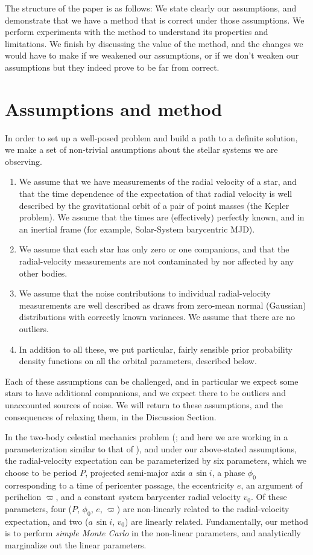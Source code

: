 \documentclass[12pt, preprint]{aastex}
\newcommand{\asini}{a\,\sin i}
\begin{document}
The structure of the paper is as follows:
We state clearly our assumptions, and demonstrate that we have a
method that is correct under those assumptions.
We perform experiments with the method to understand its properties
and limitations.
We finish by discussing the value of the method, and the changes we
would have to make if we weakened our assumptions, or if we don't
weaken our assumptions but they indeed prove to be far from correct.

\section{Assumptions and method}

In order to set up a well-posed problem and build a path to a
definite solution, we make a set of non-trivial assumptions about the
stellar systems we are observing.
\begin{enumerate}
\item We assume that we have measurements of the radial velocity of a
  star, and that the time dependence of the expectation of that radial
  velocity is well described by the gravitational orbit of a pair of
  point masses (the Kepler problem). We assume that the times are
  (effectively) perfectly known, and in an inertial frame (for
  example, Solar-System barycentric MJD).
\item We assume that each star has only zero or one companions, and
  that the radial-velocity measurements are not contaminated by nor
  affected by any other bodies.
\item We assume that the noise contributions to individual
  radial-velocity measurements are well described as draws from
  zero-mean normal (Gaussian) distributions with correctly known
  variances. We assume that there are no outliers.
\item In addition to all these, we put particular, fairly sensible
  prior probability density functions on all the orbital parameters,
  described below.
\end{enumerate}
Each of these assumptions can be challenged, and in particular we
expect some stars to have additional companions, and we expect there
to be outliers and unaccounted sources of noise.
We will return to these assumptions, and the consequences of relaxing
them, in the Discussion Section.

In the two-body celestial mechanics problem (\citealt{kepler}; and
here we are working in a parameterization similar to that of
\citealt{winn}), and under our above-stated assumptions, the
radial-velocity expectation can be parameterized by six parameters,
which we choose to be period $P$, projected semi-major axis $\asini$,
a phase $\phi_0$ corresponding to a time of pericenter passage, the
eccentricity $e$, an argument of perihelion $\varpi$, and a constant
system barycenter radial velocity $v_0$.
Of these parameters, four ($P$, $\phi_0$, $e$, $\varpi$) are
non-linearly related to the radial-velocity expectation, and two
($\asini$, $v_0$) are linearly related.
Fundamentally, our method is to perform \emph{simple Monte Carlo} in
the non-linear parameters, and analytically marginalize out the linear
parameters.
\end{document}
